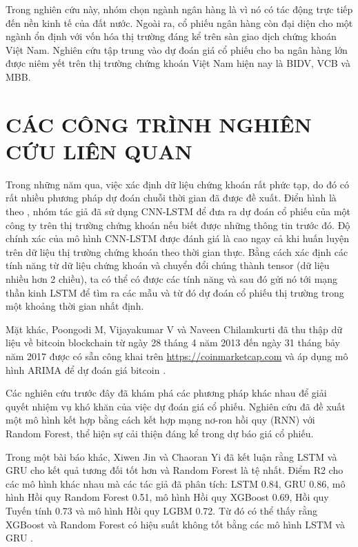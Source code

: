 \documentclass[conference]{IEEEtran}
\begin{document}
Trong nghiên cứu này, nhóm chọn ngành ngân hàng là vì nó có tác động trực tiếp đến nền kinh tế của đất nước. Ngoài ra, cổ phiếu ngân hàng còn đại diện cho một ngành ổn định với vốn hóa thị trường đáng kể trên sàn giao dịch chứng khoán Việt Nam. Nghiên cứu tập trung vào dự đoán giá cổ phiếu cho ba ngân hàng lớn được niêm yết trên thị trường chứng khoán Việt Nam hiện nay là BIDV, VCB và MBB.

\section{CÁC CÔNG TRÌNH NGHIÊN CỨU LIÊN QUAN}
Trong những năm qua, việc xác định dữ liệu chứng khoán rất phức tạp, do đó có rất nhiều phương pháp dự đoán chuỗi thời gian đã được đề xuất. Điển hình là theo \cite{predictStockCNNLSTM}, nhóm tác giả đã sử dụng CNN-LSTM để đưa ra dự đoán cổ phiếu của một công ty trên thị trường chứng khoán nếu biết được những thông tin trước đó. Độ chính xác của mô hình CNN-LSTM được đánh giá là cao ngay cả khi huấn luyện trên dữ liệu thị trường chứng khoán theo thời gian thực. Bằng cách xác định các tính năng từ dữ liệu chứng khoán và chuyển đổi chúng thành tensor (dữ liệu nhiều hơn 2 chiều), ta có thể có được các tính năng và sau đó gửi nó tới mạng thần kinh LSTM để tìm ra các mẫu và từ đó dự đoán cổ phiếu thị trường trong một khoảng thời gian nhất định.

Mặt khác, Poongodi M, Vijayakumar V và Naveen Chilamkurti đã thu thập dữ liệu về bitcoin blockchain từ ngày 28 tháng 4 năm 2013 đến ngày 31 tháng bảy năm 2017 được có sẵn công khai trên
\href{https://coinmarketcap.com}{https://coinmarketcap.com} và áp dụng mô hình ARIMA để dự đoán giá bitcoin \cite{predictBitcoinARIMA}.

Các nghiên cứu trước đây đã khám phá các phương pháp khác nhau để giải quyết nhiệm vụ khó khăn của việc dự đoán giá cổ phiếu. \cite{randomForestAndLSTM} Nghiên cứu đã đề xuất một mô hình kết hợp bằng cách kết hợp mạng nơ-ron hồi quy (RNN) với Random Forest, thể hiện sự cải thiện đáng kể trong dự báo giá cổ phiếu.

Trong một bài báo khác, Xiwen Jin và Chaoran Yi đã kết luận rằng LSTM và GRU cho kết quả tương đối tốt hơn và Random Forest là tệ nhất. Điểm R2 cho các mô hình khác nhau mà các tác giả đã phân tích: LSTM 0.84, GRU 0.86, mô hình Hồi quy Random Forest 0.51, mô hình Hồi quy XGBoost 0.69, Hồi quy Tuyến tính 0.73 và mô hình Hồi quy LGBM 0.72. Từ đó có thể thấy rằng XGBoost và Random Forest có hiệu suất không tốt bằng  các mô hình LSTM và GRU \cite{comparationLinearRegression}.
\end{document}
